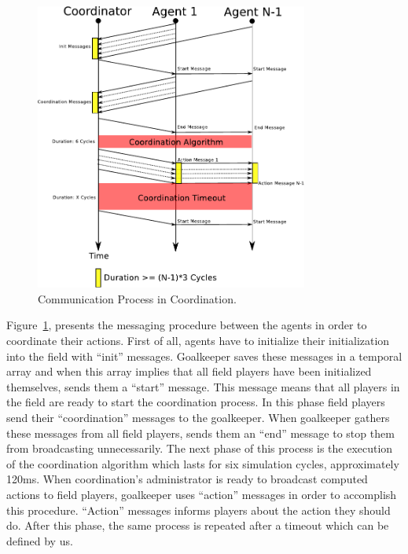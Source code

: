 \begin{figure}[t!]
\centering
  \includegraphics[width=0.8\textwidth]{Chapter4/figures/CoordComm.pdf}
  \caption{Communication Process in Coordination.} 
  \label{fig:coordinationprocess}
\end{figure}

Figure~\ref{fig:coordinationprocess}, presents the messaging procedure between the agents in order to coordinate their actions. First of all, agents have to initialize their initialization into the field with ``init'' messages. Goalkeeper saves these messages in a temporal array and when this array implies that all field players have been initialized themselves, sends them a ``start'' message. This message means that all players in the field are ready to start the coordination process. In this phase field players send their ``coordination'' messages to the goalkeeper. When goalkeeper gathers these messages from all field players, sends them an ``end'' message to stop them from broadcasting unnecessarily. The next phase of this process is the execution of the coordination algorithm which lasts for six simulation cycles, approximately 120ms. When coordination's administrator is ready to broadcast computed actions to field players, goalkeeper uses ``action'' messages in order to accomplish this procedure. ``Action'' messages informs players about the action they should do. After this phase, the same process is repeated after a timeout which can be defined by us.


